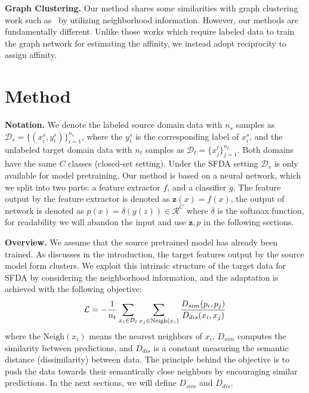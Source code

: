 \documentclass{article}
\begin{document}
\noindent \textbf{Graph Clustering.} Our method shares some similarities with graph clustering work such as~\cite{sarfraz2019efficient,wang2019linkage,yang2020learning,yang2019learning} by utilizing neighborhood information. However, our methods are fundamentally different. Unlike those works which require labeled data to train the graph network for estimating the affinity, we instead adopt reciprocity to assign affinity. 

\section{Method}


\noindent \textbf{Notation.}
We denote the labeled source domain data with $n_s$ samples as $\mathcal{D}_s = \{(x_i^s,y^s_i)\}_{i=1}^{n_s}$, where the $y^s_i$ is the corresponding label of $x_i^s$, and the unlabeled target domain data with $n_t$ samples as $\mathcal{D}_t=\{x_j^t\}_{j=1}^{n_t}$. Both domains have the same $C$ classes (closed-set setting). Under the SFDA setting $\mathcal{D}_s$ is only available for model pretraining. Our method is based on a neural network, which we split into two parts: a feature extractor $f$, and a classifier $g$. The feature output by the feature extractor is denoted as $\bm{z}(x)=f\left(x\right)$, the output of network is denoted as $p(x)=\delta(g(z)) \in \mathcal{R}^C$ where $\delta$ is the softmax function, for readability we will abandon the input and use $\bm{z}, p$ in the following sections. 

\noindent \textbf{Overview.} We assume that the source pretrained model has already been trained. As discusses in the introduction, the target features output by the source model form clusters. We exploit this intrinsic structure of the target data for SFDA by considering the neighborhood information, and the adaptation is achieved with the following objective:
\begin{eqnarray}\label{eq:raw}
\small
    \mathcal{L}=-\frac{1}{n_t}\sum_{x_i\in \mathcal{D}_t}\sum_{x_j \in \text{Neigh}(x_i)}  \frac{D_{sim}(p_i,p_j)}{D_{dis}(x_i,x_j)}
\end{eqnarray}
where the $\text{Neigh}(x_i)$ means the nearest neighbors of $x_i$, $D_{sim}$ computes the similarity between predictions, and $D_{dis}$ is a constant measuring the semantic distance (dissimilarity) between data. The principle behind the objective is to push the data towards their semantically close neighbors by encouraging similar predictions. In the next sections, we will define $D_{sim}$ and $D_{dis}$.
\end{document}
